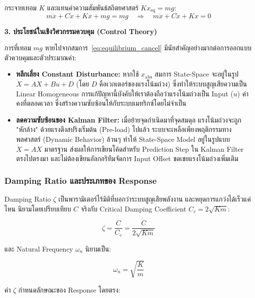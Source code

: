 กระจายเทอม $K$ และแทนค่าความสัมพันธ์สถิตยศาสตร์ $K x_\text{eq} = mg$:
\begin{equation}
    m\ddot{x} + C\dot{x} + Kx + mg = mg \quad \Rightarrow \quad m\ddot{x} + C\dot{x} + Kx = 0
    \label{eq:equilibrium_cancel}
\end{equation}

\textbf{3. ประโยชน์ในเชิงวิศวกรรมควบคุม (Control Theory)}

การที่เทอม $mg$ หายไปจากสมการ~\eqref{eq:equilibrium_cancel} มีนัยสำคัญอย่างมากต่อการออกแบบตัวควบคุมและตัวประมาณค่า:
\begin{itemize}
    \item \textbf{หลีกเลี่ยง Constant Disturbance:} หากใช้ $x_\text{abs}$ สมการ State-Space จะอยู่ในรูป $\dot{X} = AX + Bu + D$ (โดย $D$ คือเวกเตอร์ของแรงโน้มถ่วง) ซึ่งทำให้ระบบสูญเสียความเป็น Linear Homogeneous การแก้ปัญหานี้บังคับให้เราต้องถือว่าแรงโน้มถ่วงเป็น Input ($u$) ค่าคงที่ตลอดเวลา ซึ่งสร้างความซับซ้อนให้กับระบบเมทริกซ์โดยไม่จำเป็น
    \item \textbf{ลดความซับซ้อนของ Kalman Filter:} เมื่อย้ายจุดกำเนิดมาที่จุดสมดุล แรงโน้มถ่วงจะถูก "หักล้าง" ด้วยแรงตึงสปริงเริ่มต้น (Pre-load) ไปแล้ว ระบบจะเหลือเพียงพฤติกรรมทางพลศาสตร์ (Dynamic Behavior) ล้วนๆ ทำให้ State-Space Model อยู่ในรูปแบบ $\dot{X} = AX$ มาตรฐาน ส่งผลให้การเขียนโค้ดสำหรับ Prediction Step ใน Kalman Filter ตรงไปตรงมา และไม่ต้องเขียนอัลกอริทึมจัดการ Input Offset ชดเชยแรงโน้มถ่วงเพิ่มเติม
\end{itemize}
\subsubsection{Damping Ratio และประเภทของ Response}

Damping Ratio $\zeta$ เป็นพารามิเตอร์ไร้มิติที่บอกว่าระบบสูญเสียพลังงาน
และหยุดการแกว่งได้เร็วแค่ไหน นิยามโดยเปรียบเทียบ $C$ จริงกับ
Critical Damping Coefficient $C_c = 2\sqrt{Km}$:

\begin{equation}
    \zeta = \frac{C}{C_c} = \frac{C}{2\sqrt{Km}}
    \label{eq:damping_ratio}
\end{equation}

และ Natural Frequency $\omega_n$ นิยามเป็น:

\begin{equation}
    \omega_n = \sqrt{\frac{K}{m}}
    \label{eq:natural_freq}
\end{equation}

ค่า $\zeta$ กำหนดลักษณะของ Response โดยตรง:


